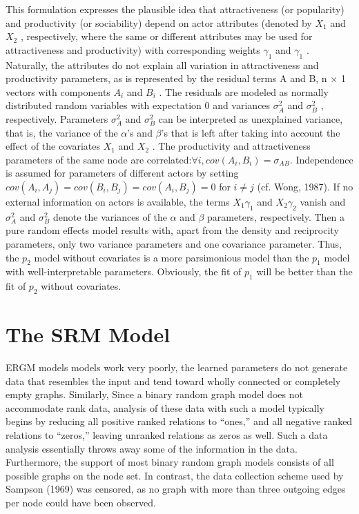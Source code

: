 \documentclass[12pt]{ociamthesis}  %
\begin{document}
	This formulation expresses the plausible idea that attractiveness (or popularity) and productivity (or sociability) depend on actor attributes (denoted by $X_{1}$ and $X_{2}$ , respectively, where the same or different attributes may be used for attractiveness and productivity) with corresponding weights $\gamma_{1}$ and $\gamma_{1}$ . Naturally, the attributes do not explain all variation in attractiveness and productivity parameters, as is represented by the residual terms A and B, n $\times$ 1 vectors with components $A_{i}$ and $B_{i}$ . The residuals are modeled as normally distributed random variables with expectation 0 and variances $\sigma_{A}^{2}$ and $\sigma_{B}^{2}$ , respectively. Parameters $\sigma_{A}^{2}$ and $\sigma_{B}^{2}$ can be interpreted as unexplained variance, that is, the variance of the $\alpha$’s and $\beta$’s that is left after taking into account the effect of the covariates $X_{1}$ and $X_{2}$ . The productivity and attractiveness parameters of the same node
	are correlated:$\forall i,  cov(A_{i} , B_{i} ) = \sigma_{AB}$. Independence is assumed for parameters of different actors by setting $cov(A_{i} , A_{j} )=cov(B_{i} , B_{j} )=cov(A_{i} , B_{j} ) = 0$ for
	$i \neq j$ (cf. Wong, 1987).
	If no external information on actors is available, the terms $X_{1} \gamma_{1}$ and $X_{2} \gamma_{2}$ vanish and $\sigma_{A}^{2}$ and $\sigma_{B}^{2}$ denote the variances of the $\alpha$ and $\beta$ parameters, respectively. Then a pure random effects model results with, apart from the density and reciprocity parameters, only two variance parameters and one covariance parameter. Thus, the $p_{2}$ model without covariates is a more parsimonious model than the $p_{1}$ model with well-interpretable parameters. Obviously, the fit of $p_{1}$
	will be better than the fit of $p_{2}$ without covariates.
	
	
	\section{The SRM Model}
	
	ERGM models models work very poorly, the learned parameters do not generate data that resembles the input and tend toward wholly connected or completely empty graphs. Similarly, Since a binary random graph model does not accommodate rank data, analysis of these data with such a model typically begins by reducing all positive ranked relations to “ones,” and all negative ranked relations to “zeros,” leaving unranked relations as zeros as well. Such a data analysis essentially throws away some of the information in the data. Furthermore, the support of most binary random graph models consists of all possible graphs on the node set. In contrast, the data collection scheme used by Sampson (1969) was censored, as no graph with more than three outgoing edges per node could have been observed.
	
\end{document}
